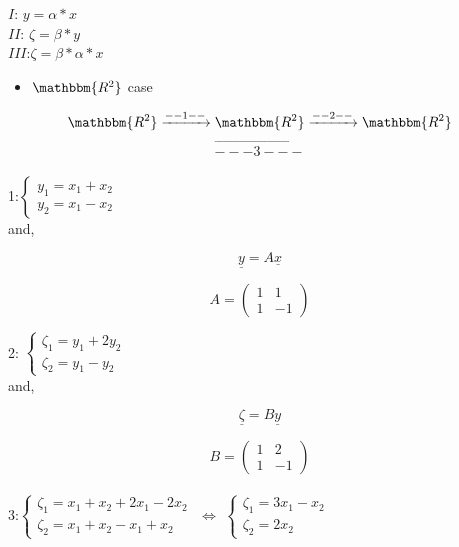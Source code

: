 \documentclass[]{article}
\providecommand{\tightlist}{%
  \setlength{\itemsep}{0pt}\setlength{\parskip}{0pt}}
\begin{document}

\(I\): \(y=\alpha*x\)\\[2\baselineskip] \(II\):
\(\zeta=\beta*y\)\\[2\baselineskip] \(III\):\(\zeta=\beta*\alpha*x\)

\begin{itemize}
\tightlist
\item
  \(\mathbbm{R^2}\) case
\end{itemize}

\[\mathbbm{R^2}\xrightarrow{--1--}\mathbbm{R^2}\xrightarrow{--2--}\mathbbm{R^2}\]
\[\overrightarrow{---3---}\]\\

1:\(\begin{cases} y_1 = x_1 + x_2\\ y_2 = x_1 - x_2 \end{cases}\)\\[2\baselineskip]
and,

\begin{equation}\label{eqn:matrix}\underline{y}=A\underline{x}\end{equation}

\[A = \begin{pmatrix} 1 & 1 \\ 1 & -1 \end{pmatrix}\]

2:
\(\begin{cases} \zeta_1= y_1 + 2y_2\\ \zeta_2 = y_1 - y_2 \end{cases}\)\\

and,

\begin{equation}\label{eqn:matrix}\underline{\zeta}=B\underline{y}\end{equation}

\[B = \begin{pmatrix} 1 & 2 \\ 1 & -1 \end{pmatrix}\]\\

3:\(\begin{cases} \zeta_1= x_1 + x_2 + 2x_1 - 2x_2 \\ \zeta_2 = x_1 + x_2 - x_1 + x_2 \end{cases}\)
\(\Longleftrightarrow\)
\(\begin{cases} \zeta_1= 3x_1 - x_2\\ \zeta_2 = 2x_2 \end{cases}\)\\
\end{document}
